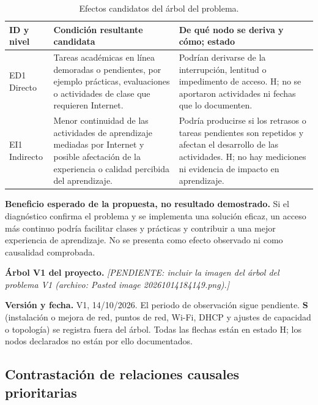 	\begin{table}[H]
		\centering
		\caption{Efectos candidatos del árbol del problema.}
		\begin{tabular}{C{1.6cm}T{5.1cm}T{7.8cm}}
			\hline
			\textbf{ID y nivel} & \textbf{Condición resultante candidata} & \textbf{De qué nodo se deriva y cómo; estado} \bigstrut\\
			\hline
			ED1 Directo & Tareas académicas en línea demoradas o pendientes, por ejemplo prácticas, evaluaciones o actividades de clase que requieren Internet. & Podrían derivarse de la interrupción, lentitud o impedimento de acceso. H; no se aportaron actividades ni fechas que lo documenten. \\
			EI1 Indirecto & Menor continuidad de las actividades de aprendizaje mediadas por Internet y posible afectación de la experiencia o calidad percibida del aprendizaje. & Podría producirse si los retrasos o tareas pendientes son repetidos y afectan el desarrollo de las actividades. H; no hay mediciones ni evidencia de impacto en aprendizaje. \\
			\hline
		\end{tabular}
		\label{tab:efectos}
	\end{table}

	\textbf{Beneficio esperado de la propuesta, no resultado demostrado.} Si el diagnóstico confirma el problema y se implementa una solución eficaz, un acceso más continuo podría facilitar clases y prácticas y contribuir a una mejor experiencia de aprendizaje. No se presenta como efecto observado ni como causalidad comprobada.

	\textbf{Árbol V1 del proyecto.} \textit{[PENDIENTE: incluir la imagen del árbol del problema V1 (archivo: Pasted image 20261014184149.png).]}


	\textbf{Versión y fecha.} V1, 14/10/2026. El periodo de observación sigue pendiente. \textbf{S} (instalación o mejora de red, puntos de red, Wi-Fi, DHCP y ajustes de capacidad o topología) se registra fuera del árbol. Todas las flechas están en estado H; los nodos declarados no están por ello documentados.

\subsection{Contrastación de relaciones causales prioritarias}


